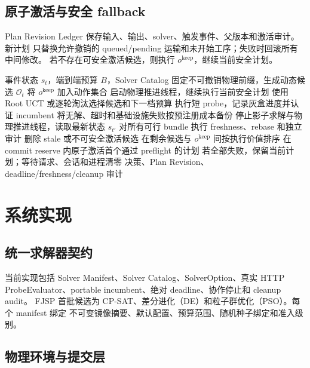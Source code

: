 \documentclass[11pt,a4paper]{article}
\newcommand{\method}{SkyCausal}
\begin{document}
\subsection{原子激活与安全 fallback}

Plan Revision Ledger 保存输入、输出、solver、触发事件、父版本和激活审计。新计划
只替换允许撤销的 queued/pending 运输和未开始工序；失败时回滚所有中间修改。
若不存在可安全激活候选，则执行 \(o^{\mathrm{keep}}\)，继续当前安全计划。

\begin{algorithm}[t]
\caption{\method{} 单次连续时钟在线决策}
\label{alg:online}
\begin{algorithmic}[1]
\REQUIRE 事件状态 \(s_t\)，端到端预算 \(B\)，Solver Catalog
\STATE 固定不可撤销物理前缀，生成动态候选 \(\mathcal{O}_t\)
\STATE 将 \(o^{\mathrm{keep}}\) 加入动作集合
\STATE 启动物理推进线程，继续执行当前安全计划
    \STATE 使用 Root UCT 或逐轮淘汰选择候选和下一档预算
    \STATE 执行短 probe，记录灰盒进度并认证 incumbent
    \STATE 将无解、超时和基础设施失败按预注册成本备份
\ENDWHILE
\STATE 停止影子求解与物理推进线程，读取最新状态 \(s_{t'}\)
\STATE 对所有可行 bundle 执行 freshness、rebase 和独立审计
\STATE 删除 stale 或不可安全激活候选
\STATE 在剩余候选与 \(o^{\mathrm{keep}}\) 间按执行价值排序
\STATE 在 commit reserve 内原子激活首个通过 preflight 的计划
\STATE 若全部失败，保留当前计划；等待请求、会话和进程清零
\RETURN 决策、Plan Revision、deadline/freshness/cleanup 审计
\end{algorithmic}
\end{algorithm}

\section{系统实现}
\label{sec:implementation}

\subsection{统一求解器契约}

当前实现包括 Solver Manifest、Solver Catalog、SolverOption、真实 HTTP
ProbeEvaluator、portable incumbent、绝对 deadline、协作停止和 cleanup audit。
FJSP 首批候选为 CP-SAT、差分进化（DE）和粒子群优化（PSO）。每个 manifest 绑定
不可变镜像摘要、默认配置、预算范围、随机种子绑定和准入级别。

\subsection{物理环境与提交层}
\end{document}
